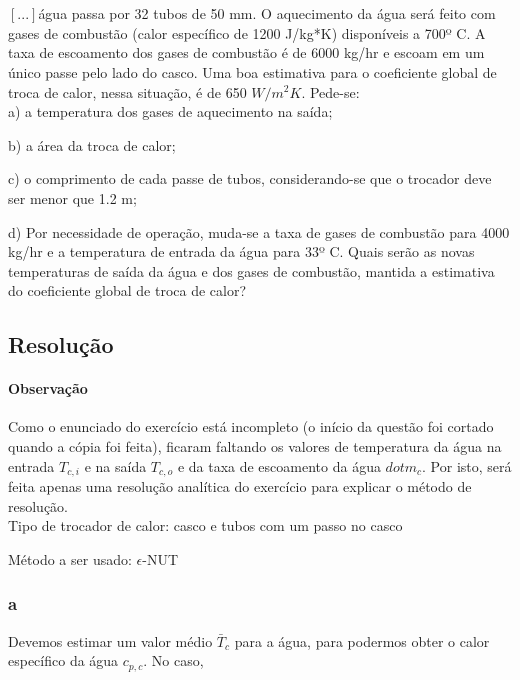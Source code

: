 \section{}

$[...]$água passa por 32 tubos de 50 mm. O aquecimento da água será feito com gases de combustão (calor específico de 1200 J/kg*K) disponíveis a 700º C. A taxa de escoamento dos gases de combustão é de 6000 kg/hr e escoam em um único passe pelo lado do casco. Uma boa estimativa para o coeficiente global de troca de calor, nessa situação, é de 650 $W/m^{2}K$. Pede-se:
\\

a) a temperatura dos gases de aquecimento na saída;

b) a área da troca de calor;

c) o comprimento de cada passe de tubos, considerando-se que o trocador deve ser menor que 1.2 m; 

d) Por necessidade de operação, muda-se a taxa de gases de combustão para 4000 kg/hr e a temperatura de entrada da água para 33º C. Quais serão as novas temperaturas de saída da água e dos gases de combustão, mantida a estimativa do coeficiente global de troca de calor?\\

\subsection{Resolução}

\paragraph{Observação} Como o enunciado do exercício está incompleto (o início da questão foi cortado quando a cópia foi feita), ficaram faltando os valores de temperatura da água na entrada $T_{c,i}$ e na saída $T_{c,o}$ e da taxa de escoamento da água $dot{m}_{c}$. Por isto, será feita apenas uma resolução analítica do exercício para explicar o método de resolução.\\

Tipo de trocador de calor: casco e tubos com um passo no casco

Método a ser usado: $\epsilon$-NUT

\subsubsection{a}

Devemos estimar um valor médio $\bar{T}_{c}$ para a água, para podermos obter o calor específico da água $c_{p,c}$. No caso, 

